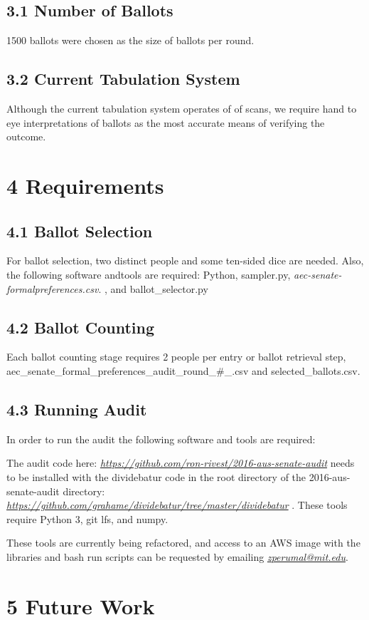 \documentclass[]{article}
\begin{document}
\subsection{3.1 Number of Ballots}\label{number-of-ballots}

1500 ballots were chosen as the size of ballots per round.

\subsection{3.2 Current Tabulation
System}\label{current-tabulation-system}

Although the current tabulation system operates of of scans, we require
hand to eye interpretations of ballots as the most accurate means of
verifying the outcome.

\section{4 Requirements}\label{requirements}

\subsection{4.1 Ballot Selection}\label{ballot-selection}

For ballot selection, two distinct people and some ten-sided dice are
needed. Also, the following software andtools are required: Python,
sampler.py, \emph{aec-senate-formalpreferences.csv}. , and
ballot\_selector.py

\subsection{4.2 Ballot Counting}\label{ballot-counting}

Each ballot counting stage requires 2 people per entry or ballot
retrieval step, aec\_senate\_formal\_preferences\_audit\_round\_\#\_.csv
and selected\_ballots.csv.

\subsection{4.3 Running Audit}\label{running-audit}

In order to run the audit the following software and tools are required:

The audit code here:
\href{https://github.com/ron-rivest/2016-aus-senate-audit}{\emph{https://github.com/ron-rivest/2016-aus-senate-audit}}
needs to be installed with the dividebatur code in the root directory of
the 2016-aus-senate-audit directory:
\href{https://github.com/grahame/dividebatur/tree/master/dividebatur}{\emph{https://github.com/grahame/dividebatur/tree/master/dividebatur}}
. These tools require Python 3, git lfs, and numpy.

These tools are currently being refactored, and access to an AWS image
with the libraries and bash run scripts can be requested by emailing
\href{mailto:zperumal@mit.edu}{\emph{zperumal@mit.edu}}.

\section{5 Future Work }\label{future-work}
\end{document}
